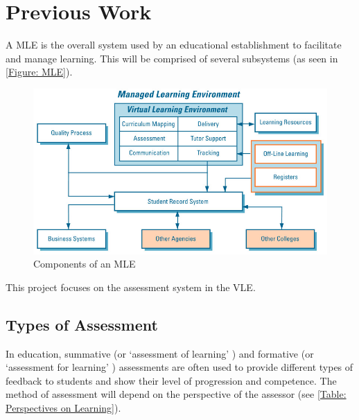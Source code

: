 \newif\ifnote
\notefalse

\chapter{Previous Work} 
\label{Chapter:Previous Work}


A \gls{MLE} is the overall system used by an educational establishment to facilitate and manage learning. This will be comprised of several subsystems (as seen in \autoref{Figure: MLE}).

\begin{figure}[h]
	\centering 
		\includegraphics[scale=0.4]{../figures/MLE.png} 		
	\caption{\label{Figure: MLE} Components of an \gls{MLE} \citep{mle}} 	
\end{figure}

This project focuses on the assessment system in the \gls{VLE}.

\section{Types of Assessment}
\label{Section: Types of Assessment}

In education, summative (or `assessment of learning' \citep{digiassess}) and formative (or `assessment for learning' \citep{digiassess}) assessments are often used to provide different types of feedback to students and show their level of progression and competence. The method of assessment will depend on the perspective of the assessor (see \autoref{Table: Perspectives on Learning}).

